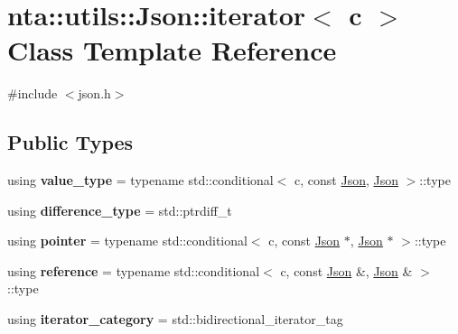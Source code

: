 \hypertarget{classnta_1_1utils_1_1Json_1_1iterator}{}\section{nta\+:\+:utils\+:\+:Json\+:\+:iterator$<$ c $>$ Class Template Reference}
\label{classnta_1_1utils_1_1Json_1_1iterator}


{\ttfamily \#include $<$json.\+h$>$}

\subsection*{Public Types}
\begin{DoxyCompactItemize}
\item 
\mbox{\label{classnta_1_1utils_1_1Json_1_1iterator_a4f7a3947bf631f014b6af1fba6e55650}} 
using {\bfseries value\+\_\+type} = typename std\+::conditional$<$ c, const \hyperlink{classnta_1_1utils_1_1Json}{Json}, \hyperlink{classnta_1_1utils_1_1Json}{Json} $>$\+::type
\item 
\mbox{\label{classnta_1_1utils_1_1Json_1_1iterator_a1de62fed92f8ed1612fa584b191dce13}} 
using {\bfseries difference\+\_\+type} = std\+::ptrdiff\+\_\+t
\item 
\mbox{\label{classnta_1_1utils_1_1Json_1_1iterator_a9724b64941d2b7097a56ae3bd26f6d6c}} 
using {\bfseries pointer} = typename std\+::conditional$<$ c, const \hyperlink{classnta_1_1utils_1_1Json}{Json} $\ast$, \hyperlink{classnta_1_1utils_1_1Json}{Json} $\ast$ $>$\+::type
\item 
\mbox{\label{classnta_1_1utils_1_1Json_1_1iterator_a0b2b7e34047092ab09ea3e6217cd52a9}} 
using {\bfseries reference} = typename std\+::conditional$<$ c, const \hyperlink{classnta_1_1utils_1_1Json}{Json} \&, \hyperlink{classnta_1_1utils_1_1Json}{Json} \& $>$\+::type
\item 
\mbox{\label{classnta_1_1utils_1_1Json_1_1iterator_a09be53898b73b32af274b07393dc9ce8}} 
using {\bfseries iterator\+\_\+category} = std\+::bidirectional\+\_\+iterator\+\_\+tag
\end{DoxyCompactItemize}

